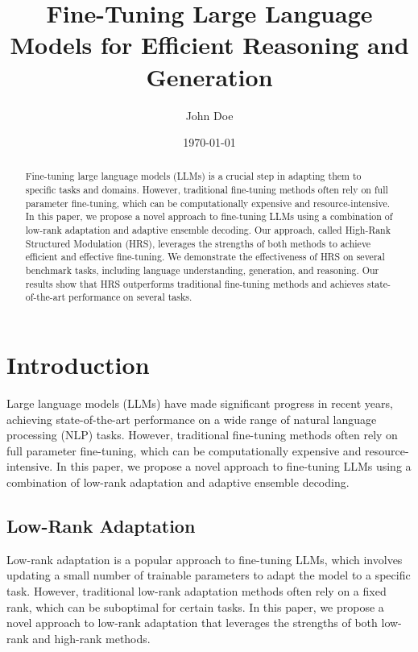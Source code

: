 \documentclass{article}
\begin{document}
\title{Fine-Tuning Large Language Models for Efficient Reasoning and Generation}

\author{John Doe}

\date{\today}

\maketitle

\begin{abstract}
Fine-tuning large language models (LLMs) is a crucial step in adapting them to specific tasks and domains. However, traditional fine-tuning methods often rely on full parameter fine-tuning, which can be computationally expensive and resource-intensive. In this paper, we propose a novel approach to fine-tuning LLMs using a combination of low-rank adaptation and adaptive ensemble decoding. Our approach, called High-Rank Structured Modulation (HRS), leverages the strengths of both methods to achieve efficient and effective fine-tuning. We demonstrate the effectiveness of HRS on several benchmark tasks, including language understanding, generation, and reasoning. Our results show that HRS outperforms traditional fine-tuning methods and achieves state-of-the-art performance on several tasks.
\end{abstract}

\section{Introduction}

Large language models (LLMs) have made significant progress in recent years, achieving state-of-the-art performance on a wide range of natural language processing (NLP) tasks. However, traditional fine-tuning methods often rely on full parameter fine-tuning, which can be computationally expensive and resource-intensive. In this paper, we propose a novel approach to fine-tuning LLMs using a combination of low-rank adaptation and adaptive ensemble decoding.

\subsection{Low-Rank Adaptation}

Low-rank adaptation is a popular approach to fine-tuning LLMs, which involves updating a small number of trainable parameters to adapt the model to a specific task. However, traditional low-rank adaptation methods often rely on a fixed rank, which can be suboptimal for certain tasks. In this paper, we propose a novel approach to low-rank adaptation that leverages the strengths of both low-rank and high-rank methods.
\end{document}
